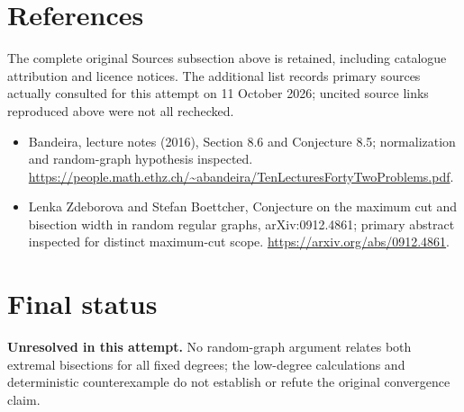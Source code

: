\documentclass[11pt]{article}
\begin{document}
\section{References}
The complete original Sources subsection above is retained, including catalogue attribution and licence notices. The additional list records primary sources actually consulted for this attempt on 11 October 2026; uncited source links reproduced above were not all rechecked.
\begin{itemize}
\item Bandeira, lecture notes (2016), Section 8.6 and Conjecture 8.5; normalization and random-graph hypothesis inspected. \url{https://people.math.ethz.ch/~abandeira/TenLecturesFortyTwoProblems.pdf}.
\item Lenka Zdeborova and Stefan Boettcher, Conjecture on the maximum cut and bisection width in random regular graphs, arXiv:0912.4861; primary abstract inspected for distinct maximum-cut scope. \url{https://arxiv.org/abs/0912.4861}.
\end{itemize}
\section{Final status}
\textbf{Unresolved in this attempt.} No random-graph argument relates both extremal bisections for all fixed degrees; the low-degree calculations and deterministic counterexample do not establish or refute the original convergence claim.
\end{document}

